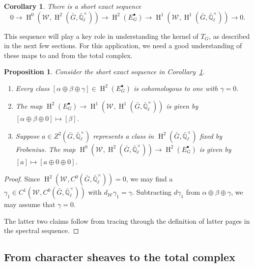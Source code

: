 \documentclass[10pt]{amsart}
\theoremstyle{plain}
\newtheorem{proposition}[theorem]{Proposition}
\newtheorem{corollary}[theorem]{Corollary}
\theoremstyle{definition}
\theoremstyle{remark}
\newcommand{\EE}{\mathbb{\bar Q}_\ell}
\newcommand{\EEx}{\EE^\times}
\newcommand{\Weil}[1]{\mathcal{W}_{#1}}
\DeclareMathOperator{\Hh}{H}
\newcommand{\TrFrob}[1]{T_{#1}}
\newcommand{\bG}{\bar{G}}
\begin{document}
\begin{corollary}\label{cor:spectral_ses}
There is a short exact sequence
 \[
    0 \to
    \Hh^0(\Weil{},\Hh^2(\bG,\EEx)) \to
    \Hh^2(E^\bullet_G) \to
    \Hh^1(\Weil{},\Hh^1(\bG,\EEx)) \to
    0.
 \]
\end{corollary}

This sequence will play a key role in understanding the kernel of $\TrFrob{G}$, as described in the next few sections.
For this application, we need a good understanding of these maps to and from the total complex.

\begin{proposition} \label{prop:ses_desc}
Consider the short exact sequence in Corollary~\ref{cor:spectral_ses}.
\begin{enumerate}
\item Every class $[\alpha\oplus\beta\oplus\gamma] \in \Hh^2(E^\bullet_G)$ is cohomologous to one with $\gamma=0$.
\item The map $\Hh^2(E^\bullet_G) \to \Hh^1(\Weil{},\Hh^1(\bG,\EEx))$ is given by $[\alpha\oplus\beta\oplus 0] \mapsto [\beta]$.
\item Suppose $a \in Z^2(\bG, \EEx)$ represents a class in $\Hh^2(\bG,\EEx)$ fixed by Frobenius.
The map $\Hh^0(\Weil{},\Hh^2(\bG,\EEx)) \to \Hh^2(E^\bullet_G)$ is given by $[a] \mapsto [a \oplus 0 \oplus 0]$.
\end{enumerate}
\end{proposition}
\begin{proof}
Since $\Hh^2(\Weil{}, C^0(\bG, \EEx)) = 0$, we may find a $\gamma_1 \in C^1(\Weil{}, C^0(\bG, \EEx))$ with $d_{\Weil{}}\gamma_1 = \gamma$.
Subtracting $d \gamma_1$ from $\alpha\oplus\beta\oplus\gamma$, we may assume that $\gamma = 0$.

The latter two claims follow from tracing through the definition of latter pages in the spectral sequence.
\end{proof}

\subsection{From character sheaves to the total complex}\label{ssec:S}
\end{document}
